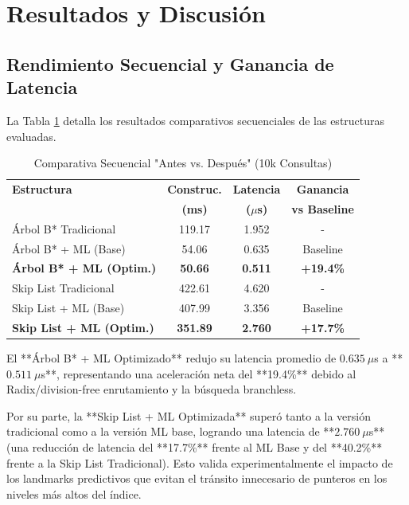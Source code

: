 \documentclass[twocolumn,10pt,journal]{IEEEtran}
\begin{document}
\section{Resultados y Discusi\'on}

\subsection{Rendimiento Secuencial y Ganancia de Latencia}

La Tabla \ref{tab:secuencial} detalla los resultados comparativos secuenciales de las estructuras evaluadas.

\begin{table}[h]
\centering
\caption{Comparativa Secuencial "Antes vs. Despu\'es" (10k Consultas)}
\label{tab:secuencial}
\begin{tabular}{lccc}
\toprule
\textbf{Estructura} & \textbf{Construc.} & \textbf{Latencia} & \textbf{Ganancia} \\
 & \textbf{(ms)} & \textbf{($\mu$s)} & \textbf{vs Baseline} \\
\midrule
\'Arbol B* Tradicional & 119.17 & 1.952 & - \\
\'Arbol B* + ML (Base) & 54.06 & 0.635 & Baseline \\
\textbf{\'Arbol B* + ML (Optim.)} & \textbf{50.66} & \textbf{0.511} & \textbf{+19.4\%} \\
\midrule
Skip List Tradicional & 422.61 & 4.620 & - \\
Skip List + ML (Base) & 407.99 & 3.356 & Baseline \\
\textbf{Skip List + ML (Optim.)} & \textbf{351.89} & \textbf{2.760} & \textbf{+17.7\%} \\
\bottomrule
\end{tabular}
\end{table}

El **\'Arbol B* + ML Optimizado** redujo su latencia promedio de $0.635\ \mu$s a **$0.511\ \mu$s**, representando una aceleraci\'on neta del **19.4\%** debido al Radix/division-free enrutamiento y la b\'usqueda branchless.

Por su parte, la **Skip List + ML Optimizada** super\'o tanto a la versi\'on tradicional como a la versi\'on ML base, logrando una latencia de **$2.760\ \mu$s** (una reducci\'on de latencia del **17.7\%** frente al ML Base y del **40.2\%** frente a la Skip List Tradicional). Esto valida experimentalmente el impacto de los landmarks predictivos que evitan el tr\'ansito innecesario de punteros en los niveles m\'as altos del \'indice.
\end{document}
